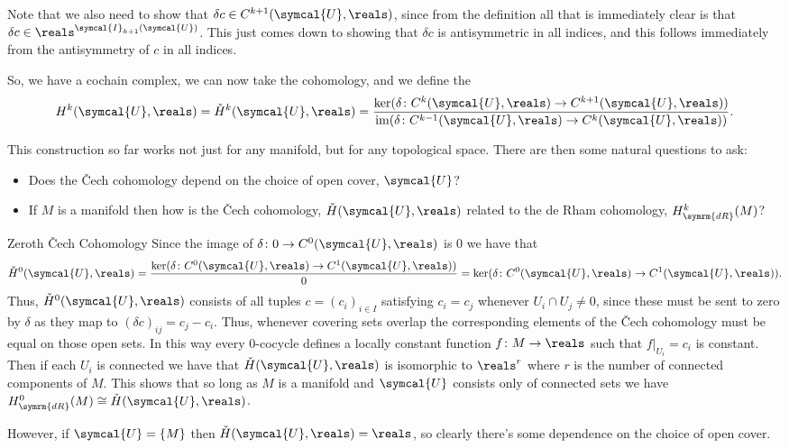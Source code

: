\documentclass[fleqn]{NotesClass}
\newcommand{\isomorphic}{\cong}
\newcommand{\openCover}{\symcal{U}}
\DeclareMathOperator{\im}{im}
\newcommand{\derham}{\symrm{dR}}
\begin{document}
    Note that we also need to show that \(\delta c \in C^{k + 1}(\openCover, \reals)\), since from the definition all that is immediately clear is that \(\delta c \in \reals^{\symcal{I}_{k+1}(\openCover)}\).
    This just comes down to showing that \(\delta c\) is antisymmetric in all indices, and this follows immediately from the antisymmetry of \(c\) in all indices. 
    
    So, we have a cochain complex, we can now take the cohomology, and we define the 
    \begin{equation}
        H^k(\openCover, \reals) = \check{H}^k(\openCover, \reals) = \frac{\ker(\delta \colon C^k(\openCover, \reals) \to C^{k + 1}(\openCover, \reals))}{\im(\delta \colon C^{k-1}(\openCover, \reals) \to C^k(\openCover, \reals))}.
    \end{equation}
    
    This construction so far works not just for any manifold, but for any topological space.
    There are then some natural questions to ask:
    \begin{itemize}
        \item Does the \v{C}ech cohomology depend on the choice of open cover, \(\openCover\)?
        \item If \(M\) is a manifold then how is the \v{C}ech cohomology, \(\check{H}(\openCover, \reals)\) related to the de Rham cohomology, \(H_{\derham}^k(M)\)?
    \end{itemize}
    
    \begin{exm}{Zeroth \v{C}ech Cohomology}{}
        Since the image of \(\delta \colon 0 \to C^0(\openCover, \reals)\) is \(0\) we have that
        \begin{equation}
            \check{H}^0(\openCover, \reals) = \frac{\ker(\delta \colon C^0(\openCover, \reals) \to C^1(\openCover, \reals))}{0} = \ker(\delta \colon C^0(\openCover, \reals) \to C^1(\openCover, \reals)).
        \end{equation}
        Thus, \(\check{H}^0(\openCover, \reals)\) consists of all tuples \(c = (c_i)_{i \in I}\) satisfying \(c_i = c_j\) whenever \(U_i \cap U_j \ne 0\), since these must be sent to zero by \(\delta\) as they map to \((\delta c)_{ij} = c_j - c_i\).
        Thus, whenever covering sets overlap the corresponding elements of the \v{C}ech cohomology must be equal on those open sets.
        In this way every 0-cocycle defines a locally constant function \(f \colon M \to \reals\) such that \(f|_{U_i} = c_i\) is constant.
        Then if each \(U_i\) is connected we have that \(\check{H}(\openCover, \reals)\) is isomorphic to \(\reals^r\) where \(r\) is the number of connected components of \(M\).
        This shows that so long as \(M\) is a manifold and \(\openCover\) consists only of connected sets we have \(H^0_{\derham}(M) \isomorphic \check{H}(\openCover, \reals)\).
        
        However, if \(\openCover = \{M\}\) then \(\check{H}(\openCover, \reals) = \reals\), so clearly there's some dependence on the choice of open cover.
    \end{exm}
    
\end{document}
